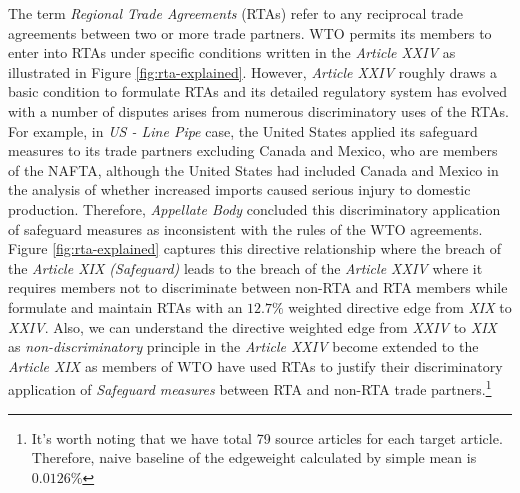 The term \textit{Regional Trade Agreements} (RTAs)
refer to any reciprocal trade agreements between two or more trade partners. 
WTO permits its members to enter into RTAs under specific conditions written in the \textit{Article XXIV} 
as illustrated in 
Figure \ref{fig:rta-explained}.
However, \textit{Article XXIV} roughly draws a basic condition to formulate RTAs and its 
detailed regulatory system has evolved with a number of disputes arises 
from numerous discriminatory uses of the RTAs. For example,
in \textit{US - Line Pipe} case, 
the United States applied its safeguard measures to its trade partners excluding Canada and Mexico, who are members of the NAFTA, although 
the United States had included Canada and Mexico in the analysis of whether increased imports caused serious injury to domestic production.
Therefore, \textit{Appellate Body} concluded this discriminatory application of safeguard measures as inconsistent with the rules of the WTO agreements. 
Figure \ref{fig:rta-explained} 
captures this directive relationship 
where the breach of the \textit{Article XIX (Safeguard)} leads to the breach of the \textit{Article XXIV} 
where it requires members not to discriminate between non-RTA and RTA members while formulate and maintain RTAs with an $12.7\%$ weighted directive edge 
from \textit{XIX} to \textit{XXIV}. Also, we can understand the directive weighted edge from \textit{XXIV} to \textit{XIX} as \textit{non-discriminatory} 
principle in the \textit{Article XXIV} become 
extended to the \textit{Article XIX} as members of WTO have used RTAs to justify their discriminatory application of \textit{Safeguard measures} between RTA and non-RTA trade partners.\footnote{It's worth noting that we have total 79 source articles for each target article. Therefore, naive baseline of the edgeweight calculated by simple mean is $0.0126\%$}

